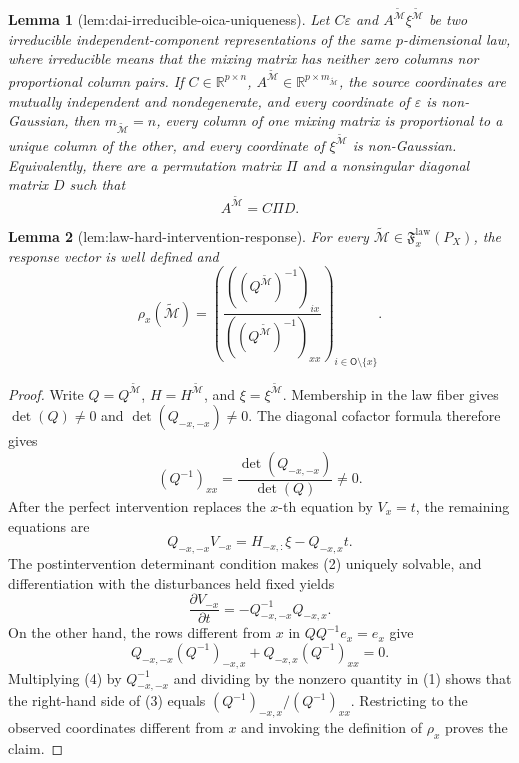 \documentclass{article}
\newtheorem{lemma}{Lemma}
\begin{document}
\begin{lemma}[lem:dai-irreducible-oica-uniqueness]\label{lem:dai-irreducible-oica-uniqueness}
Let \(C\varepsilon\) and \(A^{\widetilde{\mathcal M}}\xi^{\widetilde{\mathcal M}}\) be two irreducible independent-component representations of the same \(p\)-dimensional law, where irreducible means that the mixing matrix has neither zero columns nor proportional column pairs. If \(C\in\mathbb R^{p\times n}\), \(A^{\widetilde{\mathcal M}}\in\mathbb R^{p\times m_{\widetilde{\mathcal M}}}\), the source coordinates are mutually independent and nondegenerate, and every coordinate of \(\varepsilon\) is non-Gaussian, then \(m_{\widetilde{\mathcal M}}=n\), every column of one mixing matrix is proportional to a unique column of the other, and every coordinate of \(\xi^{\widetilde{\mathcal M}}\) is non-Gaussian. Equivalently, there are a permutation matrix \(\Pi\) and a nonsingular diagonal matrix \(D\) such that
\[
 A^{\widetilde{\mathcal M}}=C\Pi D.
\]
\end{lemma}

\begin{lemma}[lem:law-hard-intervention-response]\label{lem:law-hard-intervention-response}
For every \(\widetilde{\mathcal M}\in\mathfrak F_x^{\mathrm{law}}(P_X)\), the response vector is well defined and
\[
 \rho_x(\widetilde{\mathcal M})
 =\left(
 \frac{((Q^{\widetilde{\mathcal M}})^{-1})_{ix}}
 {((Q^{\widetilde{\mathcal M}})^{-1})_{xx}}
 \right)_{i\in\mathsf O\setminus\{x\}}.
\]
\end{lemma}
\begin{proof}
Write \(Q=Q^{\widetilde{\mathcal M}}\), \(H=H^{\widetilde{\mathcal M}}\), and \(\xi=\xi^{\widetilde{\mathcal M}}\). Membership in the law fiber gives \(\det(Q)\ne0\) and \(\det(Q_{-x,-x})\ne0\). The diagonal cofactor formula therefore gives
\[
 (Q^{-1})_{xx}=\frac{\det(Q_{-x,-x})}{\det(Q)}\ne0. \tag{1}
\]
After the perfect intervention replaces the \(x\)-th equation by \(V_x=t\), the remaining equations are
\[
 Q_{-x,-x}V_{-x}=H_{-x,:}\xi-Q_{-x,x}t. \tag{2}
\]
The postintervention determinant condition makes (2) uniquely solvable, and differentiation with the disturbances held fixed yields
\[
 \frac{\partial V_{-x}}{\partial t}=-Q_{-x,-x}^{-1}Q_{-x,x}. \tag{3}
\]
On the other hand, the rows different from \(x\) in \(QQ^{-1}e_x=e_x\) give
\[
 Q_{-x,-x}(Q^{-1})_{-x,x}+Q_{-x,x}(Q^{-1})_{xx}=0. \tag{4}
\]
Multiplying (4) by \(Q_{-x,-x}^{-1}\) and dividing by the nonzero quantity in (1) shows that the right-hand side of (3) equals \((Q^{-1})_{-x,x}/(Q^{-1})_{xx}\). Restricting to the observed coordinates different from \(x\) and invoking the definition of \(\rho_x\) proves the claim.
\end{proof}
\end{document}
